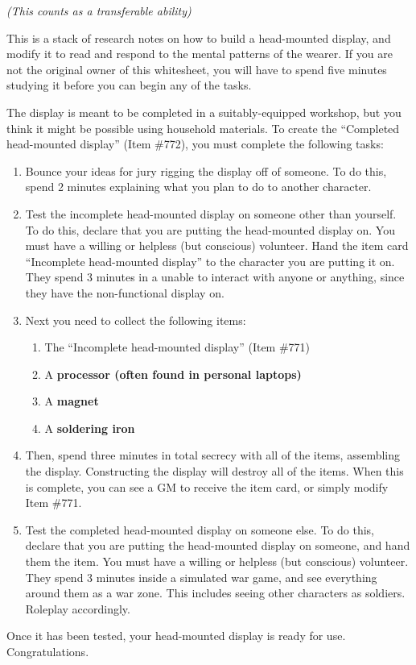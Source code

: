 \documentclass[white]{guildcamp1}
\begin{document}
\name{\wHeadMountedDisplay{}}

\emph{(This counts as a transferable ability)}

This is a stack of research notes on how to build a head-mounted display, and modify it to read and respond to the mental patterns of the wearer. If you are not the original owner of this whitesheet, you will have to spend five minutes studying it before you can begin any of the tasks.

The display is meant to be completed in a suitably-equipped workshop, but you think it might be possible using household materials. To create the ``Completed head-mounted display'' (Item \#772), you must complete the following tasks:

\begin{enumerate}
\item Bounce your ideas for jury rigging the display off of someone. To do this, spend 2 minutes explaining what you plan to do to another character.
\item Test the incomplete head-mounted display on someone other than yourself. To do this, declare that you are putting the head-mounted display on. You must have a willing or helpless (but conscious) volunteer. Hand the item card ``Incomplete head-mounted display'' to the character you are putting it on. They spend 3 minutes in a unable to interact with anyone or anything, since they have the non-functional display on.
\item  Next you need to collect the following items:
\begin{enumerate}
\item The  ``Incomplete head-mounted display'' (Item \#771)
\item A \bf{processor} (often found in personal laptops)
\item A \bf{magnet}
\item A \bf{soldering iron}
\end{enumerate}
\item Then, spend three minutes in total secrecy with all of the items, assembling the display. Constructing the display will destroy all of the items.  When this is complete, you can see a GM to receive the item card, or simply modify Item \#771.
\item Test the completed head-mounted display on someone else. To do this, declare that you are putting the head-mounted display on someone, and hand them the item. You must have a willing or helpless (but conscious) volunteer. They spend 3 minutes inside a simulated war game, and see everything around them as a war zone. This includes seeing other characters as soldiers. Roleplay accordingly.
\end{enumerate}

Once it has been tested, your head-mounted display is ready for use. Congratulations.
\end{document}
